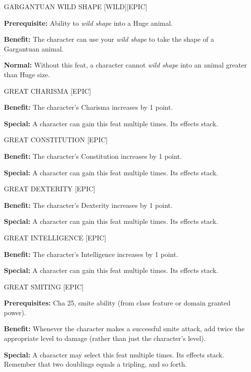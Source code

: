 \documentclass{article}
\begin{document}
\vspace{12pt}
GARGANTUAN WILD SHAPE [WILD][EPIC]

\textbf{Prerequisite:} Ability to \textit{wild shape }into a Huge animal. 

\textbf{Benefit:} The character can use your \textit{wild shape }to take the shape 
of a Gargantuan animal. 

\textbf{Normal:} Without this feat, a character cannot \textit{wild shape }into 
an animal greater than Huge size. 

\vspace{12pt}
GREAT CHARISMA [EPIC] 

\textbf{Benefit:} The character's Charisma increases by 1 point. 

\textbf{Special:} A character can gain this feat multiple times. Its effects stack. 

\vspace{12pt}
GREAT CONSTITUTION [EPIC] 

\textbf{Benefit:} The character's Constitution increases by 1 point.

\textbf{Special:} A character can gain this feat multiple times. Its effects stack. 

\vspace{12pt}
GREAT DEXTERITY [EPIC] 

\textbf{Benefit:} The character's Dexterity increases by 1 point. 

\textbf{Special:} A character can gain this feat multiple times. Its effects stack. 

\vspace{12pt}
GREAT INTELLIGENCE [EPIC] 

\textbf{Benefit:} The character's Intelligence increases by 1 point. 

\textbf{Special:} A character can gain this feat multiple times. Its effects stack. 

\vspace{12pt}
GREAT SMITING [EPIC] 

\textbf{Prerequisites:} Cha 25, smite ability (from class feature or domain granted 
power). 

\textbf{Benefit:} Whenever the character makes a successful smite attack, add twice 
the appropriate level to damage (rather than just the character's level). 

\textbf{Special:} A character may select this feat multiple times. Its effects 
stack. Remember that two doublings equals a tripling, and so forth.
\end{document}
